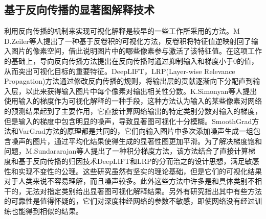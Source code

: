 \subsection{基于反向传播的显著图解释技术}
利用反向传播的机制来实现可视化解释是较早的一些工作所采用的方法。M D.Zeiler等人\textsuperscript{\cite{zeiler2014visualizing}}提出了一种基于反卷积的可视化方法，反卷积将特征值逆映射回了输入图片的像素空间，借此说明图片中的哪些像素参与激活了该特征值。在这项工作的基础上，导向反向传播方法\textsuperscript{\cite{springenberg2014striving}}提出在反向传播时通过抑制输入和梯度小于0的值，从而突出可视化目标的重要特征。DeepLIFT\textsuperscript{\cite{shrikumar2017learning}}，LRP(Layer-wise Relevance Propagation)\textsuperscript{\cite{binder2016layer}}方法通过修改反向传播的规则，将输出层的贡献逐渐向下分配直到输入层，以此来获得输入图片中每个像素对输出相关性分数。K.Simonyan等人\textsuperscript{\cite{simonyan2014deep}}提出使用输入的梯度作为可视化解释的一种手段，这种方法认为输入的某些像素对网络的预测结果起到了主要作用，它直接计算网络输出的特定类别分数对输入的梯度，但是输入的梯度中包含明显的噪声，导致显著图可视化十分模糊。SmoothGrad方法\textsuperscript{\cite{smilkov2017smoothgrad}}和VarGrad方法\textsuperscript{\cite{adebayo2018local}}的原理都是共同的，它们向输入图片中多次添加噪声生成一组包含噪声的图片，通过平均化结果使得生成的显著性图更加平滑。为了解决梯度饱和问题，M.Sundararajan等人提出了一种积分梯度方法\textsuperscript{\cite{sundararajan2017axiomatic}}，该方法结合了直接计算梯度和基于反向传播的归因技术DeepLIFT和LRP的分而治之的设计思想，满足敏感性和实现不变性的公理。这些研究虽然有坚实的理论基础，但是它们的可视化结果对于人类来说不容易理解，而且噪声较多。此外这些方法中许多是和具体类别不相干的，无法对指定类别给出显著图可视化解释结果。另外有研究\textsuperscript{\cite{adebayo2018sanity}}指出其中有些方法的可靠性是值得怀疑的，它们对深度神经网络的参数不敏感，即使网络没有经过训练也能得到相似的结果。

